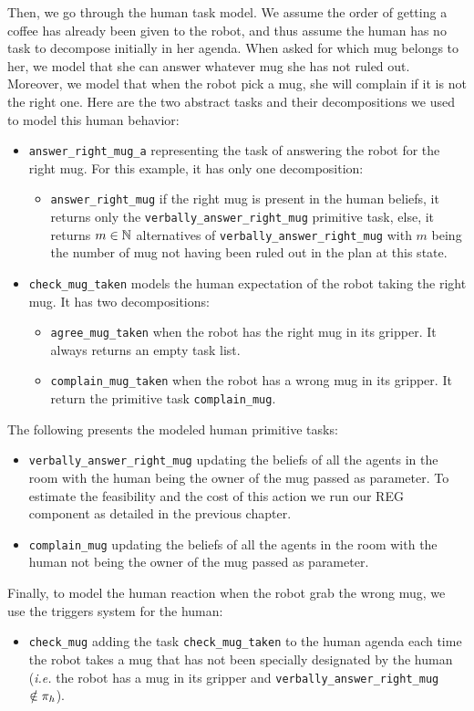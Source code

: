 \documentclass[a4paper,11pt,twoside]{StyleThese}
\begin{document}
Then, we go through the human task model. We assume the order of getting a coffee has already been given to the robot, and thus assume the human has no task to decompose initially in her agenda. When asked for which mug belongs to her, we model that she can answer whatever mug she has not ruled out. Moreover, we model that when the robot pick a mug, she will complain if it is not the right one. Here are the two abstract tasks and their decompositions we used to model this human behavior:
\begin{itemize}
\item \verb'answer_right_mug_a' representing the task of answering the robot for the right mug. For this example, it has only one decomposition:
	\begin{itemize}
	\item \verb'answer_right_mug' if the right mug is present in the human beliefs, it returns only the \verb'verbally_answer_right_mug' primitive task, else, it returns $m \in \mathbb{N}$ alternatives of \verb'verbally_answer_right_mug' with $m$ being the number of mug not having been ruled out in the plan at this state.
	\end{itemize}
\item \verb'check_mug_taken' models the human expectation of the robot taking the right mug. It has two decompositions:
	\begin{itemize}
	\item \verb'agree_mug_taken' when the robot has the right mug in its gripper. It always returns an empty task list.
	\item \verb'complain_mug_taken' when the robot has a wrong mug in its gripper. It return the primitive task \verb'complain_mug'.
	\end{itemize}
\end{itemize}
The following presents the modeled human primitive tasks:
\begin{itemize}
\item \verb'verbally_answer_right_mug' updating the beliefs of all the agents in the room with the human being the owner of the mug passed as parameter. To estimate the feasibility and the cost of this action we run our REG component as detailed in the previous chapter. 
\item \verb'complain_mug' updating the beliefs of all the agents in the room with the human not being the owner of the mug passed as parameter.
\end{itemize}
Finally, to model the human reaction when the robot grab the wrong mug, we use the triggers system for the human:
\begin{itemize}
\item \verb'check_mug' adding the task \verb'check_mug_taken' to the human agenda each time the robot takes a mug that has not been specially designated by the human (\textit{i.e.} the robot has a mug in its gripper and \verb'verbally_answer_right_mug'~$\notin \pi_h$).
\end{itemize}
\end{document}
